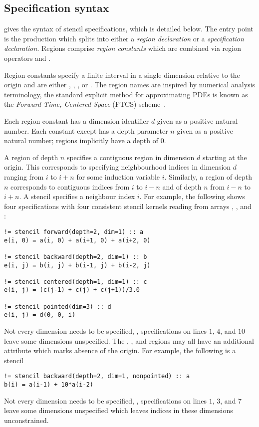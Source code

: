 \documentclass[acmlarge,review,anonymous]{acmart}\settopmatter{printfolios=true}
\theoremstyle{definition}
\theoremstyle{plain}
\begin{document}
\subsection{Specification syntax}
\label{subsec:syntax}

 gives the syntax of stencil specifications, which is
detailed below. The entry point is the  production which
splits into either a \emph{region declaration} or a \emph{specification
declaration}.
Regions comprise \emph{region constants} which are
combined via region operators \term{+} and \term{*}.

Region constants specify a finite interval in a 
single dimension relative to the origin and are either ,
, , or . The region names are
inspired by numerical analysis terminology, \eg{} the standard explicit method for
approximating PDEs is known as the \emph{Forward Time, Centered Space} (FTCS)
scheme~\citep{dawson1991finite}.

Each region
constant has a dimension identifier $d$ given as a positive natural number.
Each constant except  has a depth
parameter $n$ given as a positive natural number; 
regions implicitly have a depth of $0$.

A  region of depth $n$ specifies a contiguous
region in dimension $d$ starting at the origin. This corresponds
to specifying neighbourhood indices in dimension $d$ ranging from $i$ to $i + n$
for some induction variable $i$. Similarly, a
 region of depth $n$ corresponds to contiguous indices
from $i$ to $i - n$ and 
of depth $n$ from $i - n$ to $i + n$. A 
stencil specifies a neighbour index $i$. For example, the
following shows four specifications with four consistent stencil
kernels reading from arrays , ,  and :
\begin{verbatim}
!= stencil forward(depth=2, dim=1) :: a
e(i, 0) = a(i, 0) + a(i+1, 0) + a(i+2, 0)

!= stencil backward(depth=2, dim=1) :: b
e(i, j) = b(i, j) + b(i-1, j) + b(i-2, j)

!= stencil centered(depth=1, dim=1) :: c
e(i, j) = (c(j-1) + c(j) + c(j+1))/3.0

!= stencil pointed(dim=3) :: d
e(i, j) = d(0, 0, i)
\end{verbatim}
Not every dimension needs to be specified, \eg{},
specifications on lines $1$, $4$, and $10$ leave some dimensions unspecified.
The , , and  regions may
all have an additional attribute  which marks absence
of the origin.  For example, the following is a
  stencil
%
\begin{verbatim}
!= stencil backward(depth=2, dim=1, nonpointed) :: a
b(i) = a(i-1) + 10*a(i-2)
\end{verbatim}
%
Not every dimension needs to be specified, \eg{},
specifications on lines $1$, $3$, and $7$ leave some dimensions
unspecified which leaves indices in these dimensions unconstrained.
\end{document}
